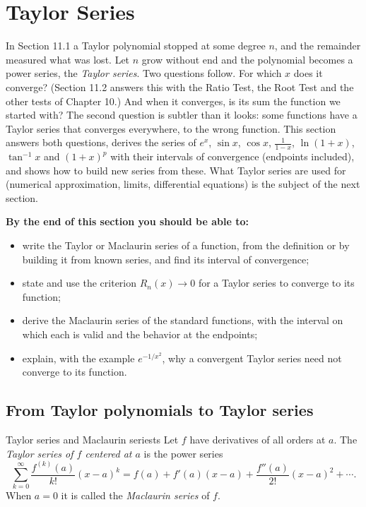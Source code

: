 \documentclass[11pt]{article}
\begin{document}
\section{Taylor Series}

\begin{guide}
In Section 11.1 a Taylor polynomial stopped at some degree $n$, and the remainder measured what was lost. Let $n$ grow without end and the polynomial becomes a power series, the \emph{Taylor series}. Two questions follow. For which $x$ does it converge? (Section 11.2 answers this with the Ratio Test, the Root Test and the other tests of Chapter 10.) And when it converges, is its sum the function we started with? The second question is subtler than it looks: some functions have a Taylor series that converges everywhere, to the wrong function. This section answers both questions, derives the series of $e^x$, $\sin x$, $\cos x$, $\frac1{1-x}$, $\ln(1+x)$, $\tan^{-1}x$ and $(1+x)^p$ with their intervals of convergence (endpoints included), and shows how to build new series from these. What Taylor series are used for (numerical approximation, limits, differential equations) is the subject of the next section.
\end{guide}

\textbf{By the end of this section you should be able to:}
\begin{itemize}
  \item write the Taylor or Maclaurin series of a function, from the definition or by building it from known series, and find its interval of convergence;
  \item state and use the criterion $R_n(x)\to0$ for a Taylor series to converge to its function;
  \item derive the Maclaurin series of the standard functions, with the interval on which each is valid and the behavior at the endpoints;
  \item explain, with the example $e^{-1/x^2}$, why a convergent Taylor series need not converge to its function.
\end{itemize}

\subsection*{From Taylor polynomials to Taylor series}

\begin{defn}{Taylor series and Maclaurin series}{ts}
Let $f$ have derivatives of all orders at $a$. The \emph{Taylor series of $f$ centered at $a$} is the power series
\[
\sum_{k=0}^\infty\frac{f^{(k)}(a)}{k!}(x-a)^k=f(a)+f'(a)(x-a)+\frac{f''(a)}{2!}(x-a)^2+\cdots .
\]
When $a=0$ it is called the \emph{Maclaurin series} of $f$.
\end{defn}
\end{document}
